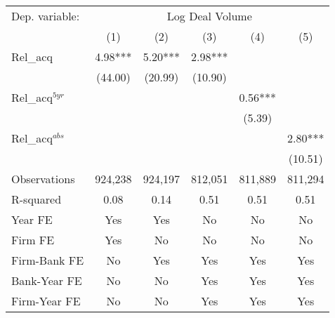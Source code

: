 {
\def\sym#1{\ifmmode^{#1}\else\(^{#1}\)\fi}
\begin{tabular*}{\hsize}{@{\hskip\tabcolsep\extracolsep\fill}l*{5}{c}}
\toprule
                Dep. variable: &\multicolumn{5}{c}{Log Deal Volume}                             \\\cmidrule(lr){2-6}
                &\multicolumn{1}{c}{(1)}   &\multicolumn{1}{c}{(2)}   &\multicolumn{1}{c}{(3)}   &\multicolumn{1}{c}{(4)}   &\multicolumn{1}{c}{(5)}   \\
\midrule
Rel\_acq        &     4.98***&     5.20***&     2.98***&            &            \\
                &  (44.00)   &  (20.99)   &  (10.90)   &            &            \\
 
Rel\_acq\(^{5yr}\)&            &            &            &     0.56***&            \\
                &            &            &            &   (5.39)   &            \\
 
Rel\_acq\(^{abs}\)&            &            &            &            &     2.80***\\
                &            &            &            &            &  (10.51)   \\
\midrule
Observations    &  924,238   &  924,197   &  812,051   &  811,889   &  811,294   \\
R-squared       &     0.08   &     0.14   &     0.51   &     0.51   &     0.51   \\
\midrule Year FE &      Yes   &      Yes   &       No   &       No   &       No   \\
Firm FE         &      Yes   &       No   &       No   &       No   &       No   \\
Firm-Bank FE    &       No   &      Yes   &      Yes   &      Yes   &      Yes   \\
Bank-Year FE    &       No   &       No   &      Yes   &      Yes   &      Yes   \\
Firm-Year FE    &       No   &       No   &      Yes   &      Yes   &      Yes   \\
\bottomrule
\end{tabular*}
}
